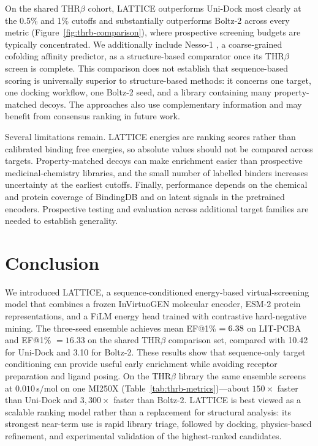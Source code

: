 \documentclass[10pt]{article}
\newcommand{\thrbLatticeSPerMol}{0.010}\newcommand{\unidockSPerMol}{1.5}\newcommand{\boltzSPerMol}{34}
\begin{document}
On the shared THR$\beta$ cohort, LATTICE outperforms Uni-Dock most clearly at the
0.5\% and 1\% cutoffs and substantially outperforms Boltz-2 across every metric
(Figure~\ref{fig:thrb-comparison}), where prospective screening budgets are
typically concentrated. We additionally include Nesso-1
\citep{valencelabs2026nesso1}, a coarse-grained cofolding affinity predictor,
as a structure-based comparator once its THR$\beta$ screen is complete. This
comparison does not establish that sequence-based scoring is universally
superior to structure-based methods: it concerns one target, one docking
workflow, one Boltz-2 seed, and a library containing many property-matched
decoys. The approaches also use complementary information and may benefit from
consensus ranking in future work.

Several limitations remain. LATTICE energies are ranking scores rather than
calibrated binding free energies, so absolute values should not be compared
across targets. Property-matched decoys can make enrichment easier than
prospective medicinal-chemistry libraries, and the small number of labelled
binders increases uncertainty at the earliest cutoffs. Finally, performance
depends on the chemical and protein coverage of BindingDB and on latent signals
in the pretrained encoders. Prospective testing and evaluation across additional
target families are needed to establish generality.

\section{Conclusion}
We introduced LATTICE, a sequence-conditioned energy-based virtual-screening
model that combines a frozen InVirtuoGEN molecular encoder, ESM-2 protein
representations, and a FiLM energy head trained with contrastive hard-negative
mining. The three-seed ensemble achieves mean EF@1\% $=6.38$ on LIT-PCBA and
EF@1\% $=16.33$ on the shared THR$\beta$ comparison set, compared with 10.42 for
Uni-Dock and 3.10 for Boltz-2. These results show that sequence-only target
conditioning can provide useful early enrichment while avoiding receptor
preparation and ligand posing.
On the THR$\beta$ library the same ensemble screens at
$\thrbLatticeSPerMol$\,s/mol on one MI250X
(Table~\ref{tab:thrb-metrics})---about $150\times$ faster than Uni-Dock and
$3{,}300\times$ faster than Boltz-2. LATTICE is best viewed as a scalable ranking
model rather than a replacement for structural analysis: its strongest near-term
use is rapid library triage, followed by docking, physics-based refinement, and
experimental validation of the highest-ranked candidates.
\newpage


\end{document}

